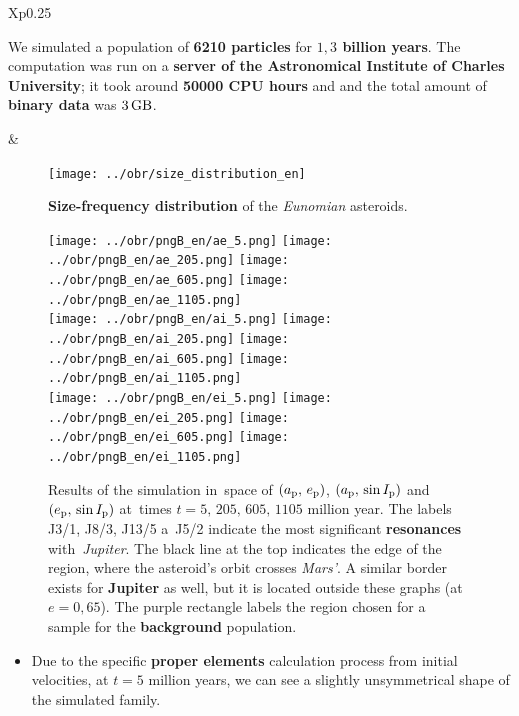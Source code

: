 \documentclass{beamer}
\newlength{\vyska}
\newlength{\vyskaB}
\newlength{\side}
\newlength{\main}
\begin{document}
\begin{frame}
\begin{columns}[t]
\begin{column}{\main}
\begin{tcolorbox}[title=Simulation of orbital evolution\vphantom{Úy},height=0.75\vyskaB]
\begin{tabularx}{\textwidth}{Xp{0.25\textwidth}}
\

	We simulated a population of \textbf{6210 particles} for \textbf{$1,3$ billion years}. The computation was run on a \textbf{server of the Astronomical Institute of Charles University}; it took around  \textbf{50000 CPU hours} and and the total amount of \textbf{binary data} was $3\,{\rm GB}$.


		&

		\vspace{-1cm}
		\begin{figure}
			\centering
			\captionsetup{width=0.2\textwidth}
			\texttt{[image: ../obr/size\_distribution\_en]}
			\caption{\textbf{Size-frequency distribution} of the \textit{Eunomian} asteroids.} 

			\label{fig:sfd}
		\end{figure}
	\end{tabularx}

	\begin{figure}[t]
		\centering
		\texttt{[image: ../obr/pngB\_en/ae\_5.png]}
		\texttt{[image: ../obr/pngB\_en/ae\_205.png]}
		\texttt{[image: ../obr/pngB\_en/ae\_605.png]}
		\texttt{[image: ../obr/pngB\_en/ae\_1105.png]}
\\
		\texttt{[image: ../obr/pngB\_en/ai\_5.png]}
		\texttt{[image: ../obr/pngB\_en/ai\_205.png]}
		\texttt{[image: ../obr/pngB\_en/ai\_605.png]}
		\texttt{[image: ../obr/pngB\_en/ai\_1105.png]}
\\
		\texttt{[image: ../obr/pngB\_en/ei\_5.png]}
		\texttt{[image: ../obr/pngB\_en/ei\_205.png]}
		\texttt{[image: ../obr/pngB\_en/ei\_605.png]}
		\texttt{[image: ../obr/pngB\_en/ei\_1105.png]}
			\captionsetup{width=.88\linewidth}
			\caption{Results of the simulation in~space of $(a_{\rm p},\,e_{\rm p})$, $(a_{\rm p},\,\sin I_{\rm p})$ and  $(e_{\rm p},\,\sin I_{\rm p})$ at~times $t=5,\,205,\,605,\,1105$ million year. The labels J3/1, J8/3, J13/5 a~J5/2 indicate the most significant \textbf{resonances} with~\textit{Jupiter}. The black line at the top indicates the edge of the region, where the asteroid's orbit crosses \textit{Mars'}. A similar border exists for \textbf{Jupiter} as well, but it is located outside these graphs (at $e=0,65$). The purple rectangle labels the region chosen for a sample for the \textbf{background} population.} \label{fig:ae_sim}
	\end{figure}

\begin{multicols}{2}

\begin{itemize}
\item 
Due to the specific \textbf{proper elements} calculation process from initial velocities, at $t=5$ million years, we can see a slightly unsymmetrical shape of the simulated family. 


\end{itemize}
\end{multicols}
\end{tcolorbox}
\end{column}
\end{columns}
\end{frame}
\end{document}
